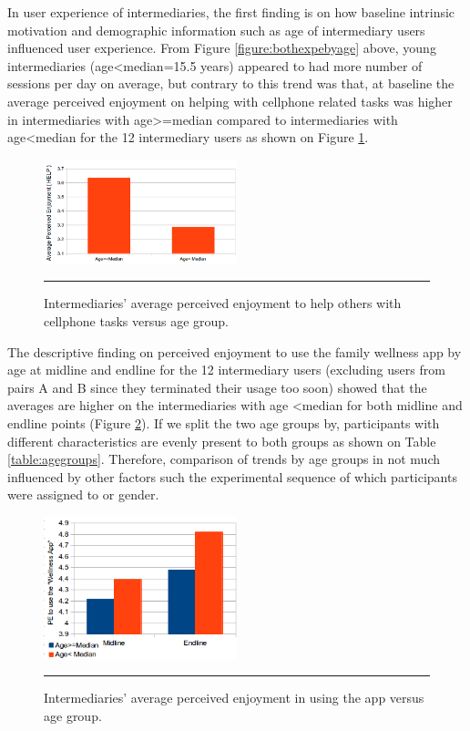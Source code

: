 In user experience of intermediaries, the first finding is on how baseline intrinsic motivation and  demographic information such as age of intermediary users influenced user experience. From Figure \ref{figure:bothexpebyage} above, young intermediaries (age\textless median=15.5 years) appeared to had more number of sessions per day on average, but contrary to this trend was that, at baseline the average perceived enjoyment on helping with cellphone related tasks was higher in intermediaries with age\textgreater=median compared to intermediaries with age\textless median for the 12 intermediary users as shown on Figure \ref{figure:PE_HELP_Age}. 
\begin{figure}[htbp]
  \centering
    \includegraphics[width=0.5\textwidth]{Figures/PE_HELP_Age.png}
    \rule{35em}{0.5pt}
  \caption{Intermediaries' average perceived enjoyment to help others with cellphone tasks versus age group.}
  \label{figure:PE_HELP_Age}
\end{figure}
The descriptive finding on perceived enjoyment to use the family wellness app by age at midline and endline for the 12 intermediary users (excluding users from pairs A and B since they terminated their usage too soon) showed that the averages are higher on the intermediaries with age \textless median for both midline and endline points (Figure \ref{figure:PE_Interm_App}). If we split the two age groups by, participants with different characteristics are evenly present to both groups as shown on Table \ref{table:agegroups}. Therefore, comparison of trends by age groups in not much influenced by other factors such the experimental sequence of which participants were assigned to or gender. 
\begin{figure}[htbp]
  \centering
    \includegraphics[width=0.5\textwidth]{Figures/PE_Interm_App.png}
    \rule{35em}{0.5pt}
  \caption{Intermediaries' average perceived enjoyment in using the app versus age group.}
  \label{figure:PE_Interm_App}
\end{figure}

